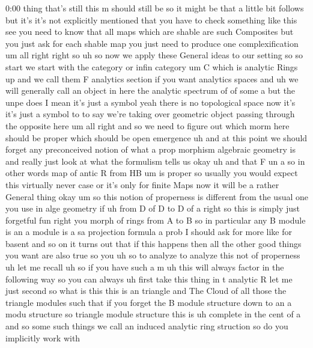 \begin{unfinished}{0:00}
thing  that's  still  this  m  should  still
be  so  it  might  be  that  a  little  bit
follows  but  it's  it's  not  explicitly
mentioned  that  you  have  to  check
something  like  this
see  you  need  to  know  that  all  maps  which
are  shable  are  such  Composites  but  you
just  ask  for  each  shable  map  you  just
need  to  produce  one
complexification
um  all
right  right  so  uh  so  now  we
apply  these  General  ideas  to  our
setting
so  so  start  we  start  with  the
category  or  infin  category  um  C  which  is
analytic  Rings
up  and  we  call  them  F  analytics
section  if  you  want  analytics
spaces
and  uh  we  will  generally  call  an  object
in  here  the  analytic  spectrum  of  of  some
a  but  the  unpe  does  I  mean  it's  just  a
symbol
yeah  there  is  no  topological  space  now
it's  it's  just  a  symbol  to  to  say  we're
taking  over  geometric  object  passing
through  the  opposite  here  um  all  right
and  so  we  need  to  figure  out  which  morm
here  should  be  proper  which  should  be
open
emergence  uh  and  at  this  point  we  should
forget  any  preconceived  notion  of  what  a
prop  morphism  algebraic  geometry  is  and
really  just  look  at  what  the  formulism
tells  us
okay
uh  and  that  F  un
a  so  in  other  words  map  of  antic  R  from
HB
um  is
proper  so  usually  you  would  expect  this
virtually  never  case  or  it's  only  for
finite  Maps  now  it  will  be  a  rather
General  thing  okay  um  so  this  notion  of
properness  is  different  from  the  usual
one  you  use  in  alge
geometry  if
uh  from  D  of  D  to  D  of
a  right  so  this  is  simply  just  forgetful
fun  right  you  morph  of  rings  from  A  to  B
so  in  particular  any  B  module  is  an  a
module  is  a  sa  projection
formula
a  prob  I  should  ask  for  more  like  for
basent  and  so  on  it  turns  out
that  if  this  happens  then  all  the  other
good  things  you  want  are  also  true
so
you
uh  so  to  analyze  to  analyze  this  not  of
properness  uh  let  me
recall  uh  so  if  you  have  such  a
m  uh  this  will  always  factor  in  the
following  way  so  you  can  always
uh  first
take  this
thing  in  t  analytic  R  let  me  just  second
so  what  is  this  this  is  an  triangle  and
The  Cloud  of  all
those  the  triangle
modules  such  that  if  you  forget  the  B
module  structure  down  to  an  a
modu  structure  so  triangle  module
structure  this  is  uh  complete  in  the
cent  of
a  and  so  some  such  things  we  call  an
induced  analytic  ring
struction  so  do  you  implicitly  work  with

\end{unfinished}
